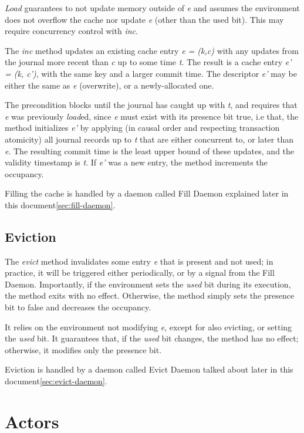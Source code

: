 \documentclass[11pt]{article}
\begin{document}
\emph{Load} guarantees to not update memory outside of \emph{e} and
assumes the environment does not overflow the cache nor update
\emph{e} (other than the used bit).
This may require concurrency control with \emph{inc}.

The \emph{inc} method updates an existing cache entry \emph{e = (k,c)}
with any updates from the journal more recent than \emph{c} up to some
time \emph{t}.
The result is a cache entry \emph{e' = (k, c')}, with the same key and a
larger commit time.
The descriptor \emph{e'} may be either the same as \emph{e} (overwrite),
or a newly-allocated one.

The precondition blocks until the journal has caught up with \emph{t},
and requires that \emph{e} was previously \emph{load}ed, since \emph{e}
must exist with its presence bit true, i.e that,
the method initializes \emph{e'} by applying (in causal order and
respecting transaction atomicity) all journal records up to \emph{t}
that are either concurrent to, or later than \emph{e}.
The resulting commit time is the least upper bound of these updates, and
the validity timestamp is \emph{t}.
If \emph{e'} was a new entry, the method increments the occupancy.

Filling the cache is handled by a daemon called Fill Daemon explained later 
in this document\ref{sec:fill-daemon}.

\subsection{Eviction}
\label{sec:eviction}

The \emph{evict} method invalidates some entry \emph{e} that is present
and not used; in practice, it will be triggered either periodically, or
by a signal from the Fill Daemon.
Importantly, if the environment sets the \emph{used} bit during its
execution, the method exits with no effect.
Otherwise, the method simply sets the presence bit to false and
decreases the occupancy.

It relies on the environment not modifying \emph{e}, except for also
evicting, or setting the \emph{used} bit.
It guarantees that, if the \emph{used} bit changes, the method has no
effect; otherwise, it modifies only the presence bit.

Eviction is handled by a daemon called Evict Daemon talked about later in this
document\ref{sec:evict-daemon}.

\section{Actors}
\end{document}
